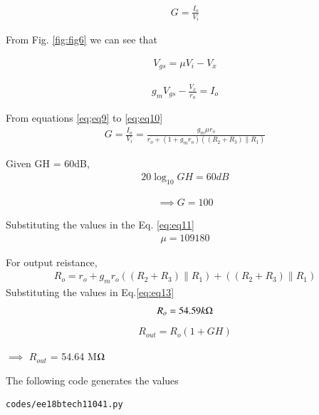 \begin{enumerate}[label=\arabic*.,ref=\theenumi]
\begin{align}
    G = \frac{I_o}{V_i} 
    \label{eq;eq8}
\end{align}

From Fig. \ref{fig:fig6} we can see that
 
\begin{align}
    V_{gs} = \mu V_i - V_x
    \label{eq;eq9}
\end{align}

\begin{align}
    g_mV_{gs} - \frac{V_x}{r_o} = I_o
    \label{eq;eq10}
\end{align}

From equations \ref{eq;eq9} to \ref{eq;eq10}
\begin{align}
    G = \frac{I_o}{V_i} = \frac{g_m \mu r_o}{r_o + (1+g_m r_o)((R_2+R_3)\|R_1) }
    \label{eq:eq11}
\end{align}


Given GH = 60dB,
\begin{align}
    20\log_{10} GH = 60 dB
    \label{eq:eq12}
\end{align}

\begin{align}
\implies G=100
\end{align}

Substituting the values in the Eq. \ref{eq:eq11}
\begin{align}
    \mu = 109180
\end{align}


For output reistance,
\begin{align}
    R_o = r_o + g_m r_o((R_2+R_3)\|R_1) + ((R_2+R_3)\|R_1)    
    \label{eq:eq13}
\end{align}
Substituting the values in Eq.\ref{eq:eq13} 
\begin{align}
    R_o=54.59k\ohm
\end{align}
\begin{align}
R_{out} = R_o(1+GH)    
\end{align}

$\implies$  $R_{out}$ = 54.64 M$\ohm$


\begin{table}[!ht]
\centering

\caption{}
\label{table: Output_Table}
\end{table}
 
    
The following code generates the values
\begin{lstlisting}
codes/ee18btech11041.py
\end{lstlisting}


\end{enumerate}
